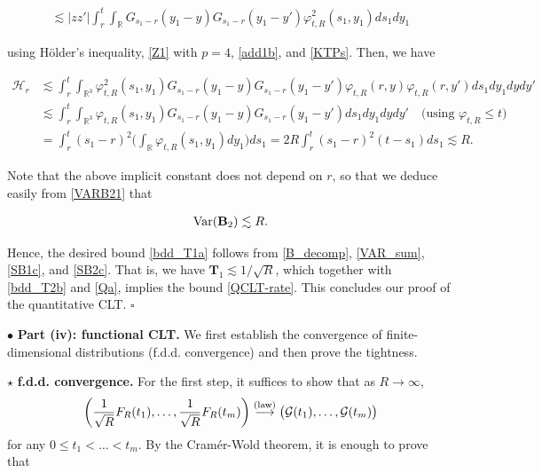 \documentclass[letterpaper, 11pt,  reqno]{amsart}
\newcommand{\noi}{\noindent}
\newcommand{\R}{\mathbb{R}}
\newcommand{\bul}{\bullet}
\newcommand{\cG}{\mathcal{G}}
\newcommand{\les}{\lesssim}
\newcommand{\Var}{\textup{Var}}
\numberwithin{equation}{section}
\numberwithin{theorem}{section}
\begin{document}
 \noi
 \begin{align*}
 \les  |zz' |   \int_r^t \int_{\R}     
 G_{s_1-r}(y_1-y) G_{s_1-r}(y_1-y')  
         \varphi^2_{t, R}(s_1, y_1)   ds_1 dy_1
 \end{align*}
 
 \noi
 using H\"older's inequality,  \eqref{Z1} with $p=4$,  \eqref{add1b}, and \eqref{KTPs}.
 Then, we have 
  
  \noi
  \begin{align*} 
 \mathcal{H}_r 
 & \les
   \int_r^t \int_{\R^3} \varphi^2_{t, R}(s_1, y_1)   
  G_{s_1-r}(y_1-y)   G_{s_1-r}(y_1-y')  
   \varphi_{t, R}(r,y)      \varphi_{t, R}(r,y') 
  ds_1 dy_1 dy dy' \\
  &\les \int_r^t \int_{\R^3} \varphi_{t, R}(s_1, y_1)   
  G_{s_1-r}(y_1-y)   G_{s_1-r}(y_1-y')  
  ds_1 dy_1 dy dy'  \quad\text{(using $\varphi_{t,R}\leq t$)} \\
&=     \int_r^t  (s_1-r)^2 \bigg( \int_{\R} \varphi_{t, R}(s_1, y_1)     dy_1  \bigg)   ds_1 
=  2R  \int_r^t  (s_1-r)^2  (t-s_1)  ds_1  \les R.
 \end{align*}
 
 
 
 
 
\noi
 Note that the above implicit constant does not depend on $r$, so that we deduce 
 easily from \eqref{VARB21} that 
 
 \noi
 \begin{align}\label{SB2c}
 \Var(  \mathbf{B}_2)   \les  R.
 \end{align}
 
 Hence, the desired bound \eqref{bdd_T1a}
 follows from \eqref{B_decomp}, \eqref{VAR_sum}, \eqref{SB1c}, and
 \eqref{SB2c}.
 That is, we have $\mathbf{T}_1 \les 1/\sqrt{R}$,
 which together with \eqref{bdd_T2b} and \eqref{Qa},
 implies the bound \eqref{QCLT-rate}.
 This concludes our proof of the quantitative CLT. 
  \hfill $\square$
  

  
  
 
 \bigskip


 
\noi
$\bul$ 
\textbf{Part (iv): \textsf{functional CLT}.} 
We first establish the  convergence of  finite-dimensional distributions (f.d.d. convergence)
and then prove the tightness.

\smallskip

$\star$  \textbf{f.d.d. convergence.}
For the first step, it suffices to show that as $R \to \infty$,
\[
\left(\frac{1}{\sqrt{R}}F_R(t_1),\ldots, \frac{1}{\sqrt{R}}F_R(t_m)\right) 
\stackrel{{\rm (law)}}{\longrightarrow} \big(\cG(t_1),\ldots,\cG(t_m) \big)
\]
for any $0\leq t_1<\ldots<t_m$. By the Cram\'er-Wold theorem, 
it is enough  to prove that 
\end{document}

